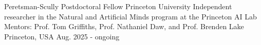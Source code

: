 \begin{cventries}
\vspace{-12mm}
\cventryEd
    {} %
    {} %
    {}
    {} %
    {} %
    {}
\cventryLab
{Peretsman-Scully Postdoctoral Fellow} %
{Princeton University} %
{Independent researcher in the Natural and Artificial Minds program at the Princeton AI Lab Mentors: Prof. Tom Griffiths, Prof. Nathaniel Daw, and Prof. Brenden Lake}
{Princeton, USA} %
{Aug. 2025 - ongoing} %
{}
\vspace{3mm}
\end{cventries}